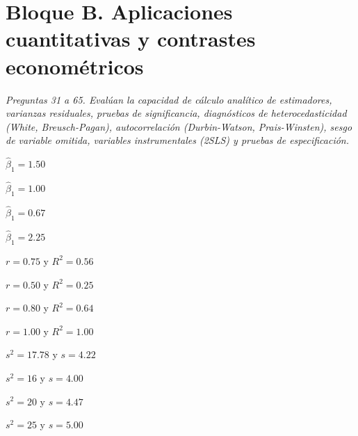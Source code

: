\section*{Bloque B. Aplicaciones cuantitativas y contrastes econométricos}

\noindent\textit{Preguntas 31 a 65. Evalúan la capacidad de cálculo analítico de estimadores, varianzas residuales, pruebas de significancia, diagnósticos de heterocedasticidad (White, Breusch-Pagan), autocorrelación (Durbin-Watson, Prais-Winsten), sesgo de variable omitida, variables instrumentales (2SLS) y pruebas de especificación.}

\begin{opts}
    \item $\hat{\beta}_1 = 1.50$
    \item $\hat{\beta}_1 = 1.00$
    \item $\hat{\beta}_1 = 0.67$
    \item $\hat{\beta}_1 = 2.25$
\end{opts}

\begin{opts}
    \item $r = 0.75$ y $R^2 = 0.56$
    \item $r = 0.50$ y $R^2 = 0.25$
    \item $r = 0.80$ y $R^2 = 0.64$
    \item $r = 1.00$ y $R^2 = 1.00$
\end{opts}

\begin{opts}
    \item $s^2 = 17.78$ y $s = 4.22$
    \item $s^2 = 16$ y $s = 4.00$
    \item $s^2 = 20$ y $s = 4.47$
    \item $s^2 = 25$ y $s = 5.00$
\end{opts}

